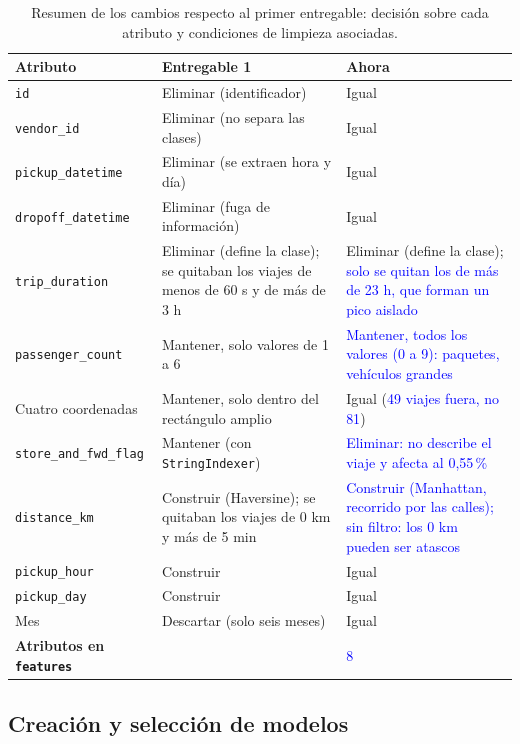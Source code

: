 \documentclass[12pt,a4paper]{article}
\newcommand{\cambio}[1]{\textcolor{blue}{#1}}
\begin{document}
\begin{table}[H]
\centering
\small
\begin{tabular}{>{\raggedright\arraybackslash}p{3.6cm} >{\raggedright\arraybackslash}p{5.0cm} >{\raggedright\arraybackslash}p{5.0cm}}
\toprule
\textbf{Atributo} & \textbf{Entregable 1} & \textbf{Ahora} \\
\midrule
\texttt{id} & Eliminar (identificador) & Igual \\
\texttt{vendor\_id} & Eliminar (no separa las clases) & Igual \\
\texttt{pickup\_datetime} & Eliminar (se extraen hora y día) & Igual \\
\texttt{dropoff\_datetime} & Eliminar (fuga de información) & Igual \\
\texttt{trip\_duration} & Eliminar (define la clase); se quitaban los viajes de menos de 60 s y de más de 3 h & Eliminar (define la clase); \cambio{solo se quitan los de más de 23 h, que forman un pico aislado} \\
\texttt{passenger\_count} & Mantener, solo valores de 1 a 6 & \cambio{Mantener, todos los valores (0 a 9): paquetes, vehículos grandes} \\
Cuatro coordenadas & Mantener, solo dentro del rectángulo amplio & Igual (\cambio{49 viajes fuera, no 81}) \\
\texttt{store\_and\_fwd\_flag} & Mantener (con \texttt{StringIndexer}) & \cambio{Eliminar: no describe el viaje y afecta al 0,55\,\%} \\
\texttt{distance\_km} & Construir (Haversine); se quitaban los viajes de 0 km y más de 5 min & \cambio{Construir (Manhattan, recorrido por las calles); sin filtro: los 0 km pueden ser atascos} \\
\texttt{pickup\_hour} & Construir & Igual \\
\texttt{pickup\_day} & Construir & Igual \\
Mes & Descartar (solo seis meses) & Igual \\
\midrule
\textbf{Atributos en \texttt{features}} & 9 & \cambio{8} \\
\bottomrule
\end{tabular}
\caption{Resumen de los cambios respecto al primer entregable: decisión sobre cada atributo y condiciones de limpieza asociadas.}
\label{tab:atributos}
\end{table}

\subsection{Creación y selección de modelos}
\label{sec:seleccion}
\end{document}
